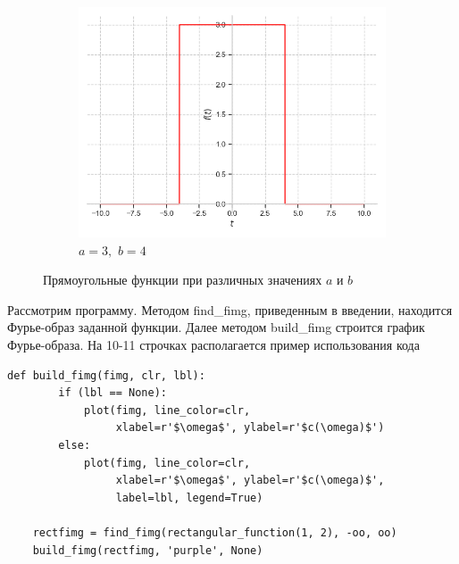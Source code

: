 \documentclass[a4paper, 16pt]{article}
\begin{document}
\begin{figure}[htbp]
\begin{subfigure}{0.3\textwidth}
        \end{subfigure}
        \hfill
        \begin{subfigure}{0.3\textwidth}
            \centering
            \includegraphics[width=\linewidth]{rectf_a=3_b=4.png}
            \caption{$a=3,\,\,b=4$}
            \label{fig:rectf_3}
        \end{subfigure}
        \caption{Прямоугольные функции при различных значениях $a$ и $b$}
        \label{fig:rectfs}
    \end{figure}


    \noindent Рассмотрим программу. Методом find\_{fimg}, приведенным в введении, находится Фурье-образ заданной функции.
    Далее методом build\_{fimg} строится график Фурье-образа. На 10-11 строчках располагается пример использования кода
    \begin{lstlisting}[label=fimg_rect, caption=Программа для построения графика Фурье-образа некоторой функции $f(t)$]
    def build_fimg(fimg, clr, lbl):
        if (lbl == None):
            plot(fimg, line_color=clr,
                 xlabel=r'$\omega$', ylabel=r'$c(\omega)$')
        else:
            plot(fimg, line_color=clr,
                 xlabel=r'$\omega$', ylabel=r'$c(\omega)$',
                 label=lbl, legend=True)
    
    rectfimg = find_fimg(rectangular_function(1, 2), -oo, oo)
    build_fimg(rectfimg, 'purple', None)
    \end{lstlisting}
\end{document}
